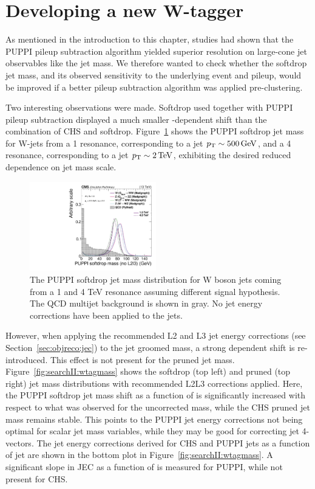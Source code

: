 \clearpage
\section{Developing a new W-tagger}
\label{sec:searchII:puppisoftdrop}
As mentioned in the introduction to this chapter, studies had shown that the PUPPI pileup subtraction algorithm yielded superior resolution on large-cone jet observables like the jet mass. We therefore wanted to check whether the softdrop jet mass, and its observed sensitivity to the underlying event and pileup, would be improved if a better pileup subtraction algorithm was applied pre-clustering.\par
Two interesting observations were made. Softdrop used together with PUPPI pileup subtraction displayed a much smaller \PT-dependent shift than the combination of CHS and softdrop. Figure~\ref{fig:searchII:sdmass} shows the PUPPI softdrop jet mass for W-jets from a 1 \TeV resonance, corresponding to a jet $p_{\mathrm{T}}\sim 500 \,\text{Ge\hspace{-.08em}V}$, and a 4 \TeV resonance, corresponding to a jet $p_{\mathrm{T}}\sim 2 \,\text{Te\hspace{-.08em}V}$, exhibiting the desired reduced \PT dependence on jet mass scale. 
\begin{figure}[h!]
\centering
\includegraphics[width=0.49\textwidth]{figures/analysis/search2/AN-16-235/plots/gen_SoftdropMassUnCorr.pdf}
\caption{The PUPPI softdrop jet mass distribution for W boson jets coming from a 1 and 4 TeV resonance assuming different signal hypothesis. The QCD multijet background is shown in gray. No jet energy corrections have been applied to the jets.}
\label{fig:searchII:sdmass}
\end{figure}
However, when applying the recommended L2 and L3 jet energy corrections (see Section~\ref{sec:objreco:jec}) to the jet groomed mass, a strong \PT dependent shift is re-introduced. This effect is not present for the pruned jet mass. Figure~\ref{fig:searchII:wtagmass} shows the softdrop (top left) and pruned (top right) jet mass distributions with recommended L2L3 corrections applied. Here, the PUPPI softdrop jet mass shift as a function of \PT is significantly increased with respect to what was observed for the uncorrected mass, while the CHS pruned jet mass remains stable. This points to the PUPPI jet energy corrections not being optimal for scalar jet mass variables, while they may be good for correcting jet 4-vectors. The jet energy corrections derived for CHS and PUPPI jets as a function of jet \PT are shown in the bottom plot in Figure~\ref{fig:searchII:wtagmass}. A significant slope in JEC as a function of \PT is measured for PUPPI, while not present for CHS.

